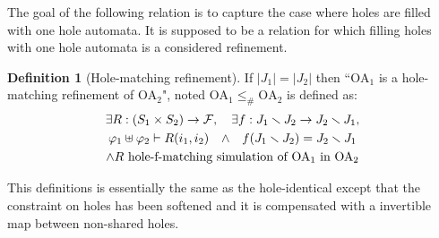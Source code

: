\documentclass{article}
\theoremstyle{plain}
\theoremstyle{definition}
\newtheorem{defi}{Definition}
\newcommand\mpar[1]{{\left(#1\right)}}
\newcommand\card[1]{{\left|#1\right|}}
\newcommand\qwedge{\DOTSB\quad{\wedge}\quad}
\newcommand\formulae{{\mathcal{F}}}
\begin{document}
The goal of the following relation is to capture the case where holes are filled with one hole automata.
It is supposed to be a relation for which filling holes with one hole automata is a considered refinement.
\begin{defi}[Hole-matching refinement]
If \(\card{J_1} = \card{J_2}\) then ``\(\mathrm{OA}_1\) is a hole-matching refinement of \(\mathrm{OA}_2\)", noted \(\mathrm{OA}_1 \leq_\# \mathrm{OA}_2\) is defined as:
\begin{multline*}
	\exists R: \mpar{S_1 \times S_2} \to \formulae, \quad \exists f: J_1 \setminus J_2 \to J_2 \setminus J_1, \\
	\varphi_1 \uplus \varphi_2 \vdash R\mpar{i_1, i_2} \qwedge f\mpar{J_1 \setminus J_2} = J_2 \setminus J_1 \\
	\wedge R \text{ hole-f-matching simulation of } \mathrm{OA}_1 \text{ in } \mathrm{OA}_2
\end{multline*}
\end{defi}
This definitions is essentially the same as the hole-identical except that the constraint on holes has been softened and it is compensated with a invertible map between non-shared holes.
\end{document}
